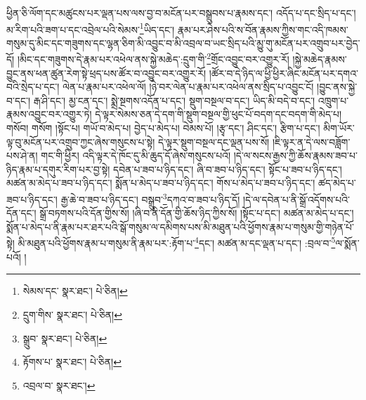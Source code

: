 ཕྱིན་ཅི་ལོག་དང་མཚུངས་པར་ལྡན་པས་ལས་བྱ་བ་མངོན་པར་བསྒྲུབས་པ་རྣམས་དང་། འདོད་པ་དང་སྲིད་པ་དང་། མ་རིག་པའི་ཟག་པ་དང་འབྲེལ་པའི་སེམས་\footnote{སེམས་དང་  སྣར་ཐང་།  པེ་ཅིན། }ཡིད་དང་། རྣམ་པར་ཤེས་པའི་ས་བོན་རྣམས་ཀྱིས་གང་འདི་ཁམས་གསུམ་དུ་མིང་དང་གཟུགས་དང་ལྷན་ཅིག་མི་འབྱུང་བ་མི་འབྲལ་བ་ཡང་སྲིད་པའི་མྱུ་གུ་མངོན་པར་འགྲུབ་པར་བྱེད་དོ། །མིང་དང་གཟུགས་དེ་རྣམ་པར་འཕེལ་ནས་སྐྱེ་མཆེད་:དྲུག་གི་\footnote{དྲུག་གིས་  སྣར་ཐང་།  པེ་ཅིན། }གྲོང་འབྱུང་བར་འགྱུར་རོ། །སྐྱེ་མཆེད་རྣམས་བྱུང་ནས་ཕན་ཚུན་རེག་སྟེ་ཕྲད་པས་ཚོར་བ་འབྱུང་བར་འགྱུར་རོ། །ཚོར་བ་དེ་ཉིད་ལ་ཕྱི་ཕྱིར་ཞིང་མངོན་པར་དགའ་བའི་སྲེད་པ་དང་། ལེན་པ་རྣམ་པར་འཕེལ་ལོ། །ཉེ་བར་ལེན་པ་རྣམ་པར་འཕེལ་ནས་སྲིད་པ་འབྱུང་ངོ། །བྱུང་ནས་སྐྱེ་བ་དང་། རྒ་ཤི་དང་། མྱ་ངན་དང་། སྨྲེ་སྔགས་འདོན་པ་དང་། སྡུག་བསྔལ་བ་དང་། ཡིད་མི་བདེ་བ་དང་། འཁྲུག་པ་རྣམས་འབྱུང་བར་འགྱུར་ཏེ། དེ་ལྟར་སེམས་ཅན་དེ་དག་གི་སྡུག་བསྔལ་གྱི་ཕུང་པོ་བདག་དང་བདག་གི་མེད་པ། གསོབ། གསོག །སྟོང་པ། གཡོ་བ་མེད་པ། བྱེད་པ་མེད་པ། བེམས་པོ། །རྩྭ་དང་། ཤིང་དང་། རྩིག་པ་དང་། མིག་ཡོར་ལྟ་བུ་མངོན་པར་འགྲུབ་ཀྱང་ཞེས་གསུངས་པ་སྟེ། དེ་ལྟར་སྡུག་བསྔལ་དང་ལྡན་པས་སོ། །ཇི་ལྟར་ན་དེ་ལས་བཟློག་པས་ཤེ་ན། གང་གི་ཕྱིར། འདི་ལྟར་དེ་ཁོང་དུ་མི་ཆུད་དོ་ཞེས་གསུངས་པའོ། །དེ་ལ་སངས་རྒྱས་ཀྱི་ཆོས་རྣམས་ཟབ་པ་ཉིད་རྣམ་པ་དགུར་རིག་པར་བྱ་སྟེ། དབེན་པ་ཟབ་པ་ཉིད་དང་། ཞི་བ་ཟབ་པ་ཉིད་དང་། སྟོང་པ་ཟབ་པ་ཉིད་དང་། མཚན་མ་མེད་པ་ཟབ་པ་ཉིད་དང་། སྨོན་པ་མེད་པ་ཟབ་པ་ཉིད་དང་། གོས་པ་མེད་པ་ཟབ་པ་ཉིད་དང་། ཚད་མེད་པ་ཟབ་པ་ཉིད་དང་། རྒྱ་ཆེ་བ་ཟབ་པ་ཉིད་དང་། བསྒྲུབ་\footnote{སྒྲུབ་  སྣར་ཐང་།  པེ་ཅིན། }དཀའ་བ་ཟབ་པ་ཉིད་དོ། །དེ་ལ་དབེན་པ་ནི་སྒྲོ་འདོགས་པའི་དོན་དང་། སྒྲོ་བཏགས་པའི་དོན་གྱིས་སོ། །ཞི་བ་ནི་དོན་གྱི་ཆོས་ཉིད་ཀྱིས་སོ། །སྟོང་པ་དང་། མཚན་མ་མེད་པ་དང་། སྨོན་པ་མེད་པ་ནི་རྣམ་པར་ཐར་པའི་སྒོ་གསུམ་ལ་དམིགས་པས་མི་མཐུན་པའི་ཕྱོགས་རྣམ་པ་གསུམ་གྱི་གཉེན་པོ་སྟེ། མི་མཐུན་པའི་ཕྱོགས་རྣམ་པ་གསུམ་ནི་རྣམ་པར་:རྟོག་པ་\footnote{རྟོགས་པ་  སྣར་ཐང་།  པེ་ཅིན། }དང་། མཚན་མ་དང་ལྡན་པ་དང་། :བྲལ་བ་\footnote{འབྲལ་བ་  སྣར་ཐང་། }ལ་སྨོན་པའོ། །

